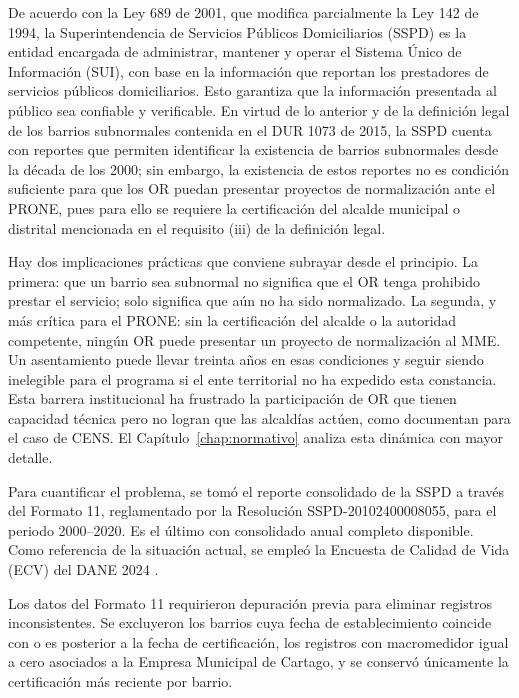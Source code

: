 De acuerdo con la Ley 689 de 2001, que modifica parcialmente la Ley 142 de 1994, la Superintendencia de Servicios Públicos Domiciliarios (SSPD) es la entidad encargada de administrar, mantener y operar el Sistema Único de Información (SUI), con base en la información que reportan los prestadores de servicios públicos domiciliarios. Esto garantiza que la información presentada al público sea confiable y verificable. En virtud de lo anterior y de la definición legal de los barrios subnormales contenida en el DUR 1073 de 2015, la SSPD cuenta con reportes que permiten identificar la existencia de barrios subnormales desde la década de los 2000; sin embargo, la existencia de estos reportes no es condición suficiente para que los OR puedan presentar proyectos de normalización ante el PRONE, pues para ello se requiere la certificación del alcalde municipal o distrital mencionada en el requisito (iii) de la definición legal.

Hay dos implicaciones prácticas que conviene subrayar desde el principio. La primera: que un barrio sea subnormal no significa que el OR tenga prohibido prestar el servicio; solo significa que aún no ha sido normalizado. La segunda, y más crítica para el PRONE: sin la certificación del alcalde o la autoridad competente, ningún OR puede presentar un proyecto de normalización al MME. Un asentamiento puede llevar treinta años en esas condiciones y seguir siendo inelegible para el programa si el ente territorial no ha expedido esta constancia. Esta barrera institucional ha frustrado la participación de OR que tienen capacidad técnica pero no logran que las alcaldías actúen, como documentan \textcite{CabralesSanjuan2015} para el caso de CENS. El Capítulo~\ref{chap:normativo} analiza esta dinámica con mayor detalle.

Para cuantificar el problema, se tomó el reporte consolidado de la SSPD a través del Formato 11, reglamentado por la Resolución SSPD-20102400008055, para el periodo 2000--2020. Es el último con consolidado anual completo disponible. Como referencia de la situación actual, se empleó la Encuesta de Calidad de Vida (ECV) del DANE 2024 \parencite{SSPD2020, DANE2024a}.

Los datos del Formato 11 requirieron depuración previa para eliminar registros inconsistentes. Se excluyeron los barrios cuya fecha de establecimiento coincide con o es posterior a la fecha de certificación, los registros con macromedidor igual a cero asociados a la Empresa Municipal de Cartago, y se conservó únicamente la certificación más reciente por barrio.

